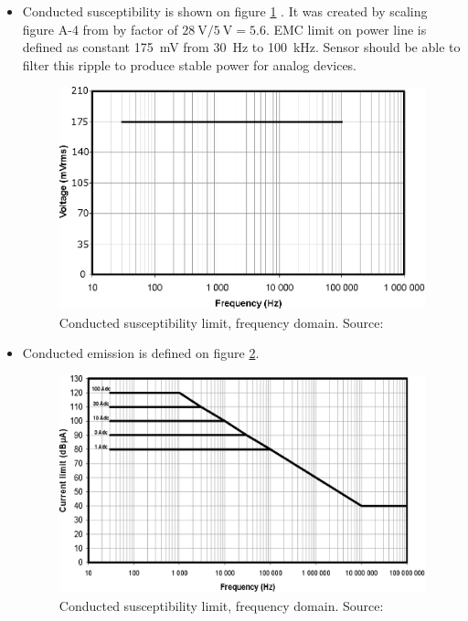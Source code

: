 	\begin{itemize}
		\item Conducted susceptibility is shown on figure \ref{EMC_conducted_susceptibility} . It was created by scaling figure A-4 from \cite{ECSS_E_ST_20_07C} by factor of $\SI{28}{\volt}/\SI{5}{\volt} = 5.6$. EMC limit on power line is defined as constant \SI{175}{\milli\volt} from \SI{30}{\hertz} to \SI{100}{\kilo\hertz}. Sensor should be able to filter this ripple to produce stable power for analog devices.
		
		\begin{figure}[H]
			\centering
			\includegraphics[width=0.5\paperwidth]{img/EMC_conducted_susceptibility.eps}
			\caption{Conducted susceptibility limit, frequency domain. Source: \cite{ECSS_E_ST_20_07C}}
			\label{EMC_conducted_susceptibility}
		\end{figure}
	
	
		\item Conducted emission is defined on figure \ref{EMC_conducted_emission}.
		
		\begin{figure}[H]
			\centering
			\includegraphics[width=0.5\paperwidth]{img/EMC_conducted_emission.eps}
			\caption{Conducted susceptibility limit, frequency domain. Source: \cite{ECSS_E_ST_20_07C}}
			\label{EMC_conducted_emission}
		\end{figure}	



\end{itemize}
